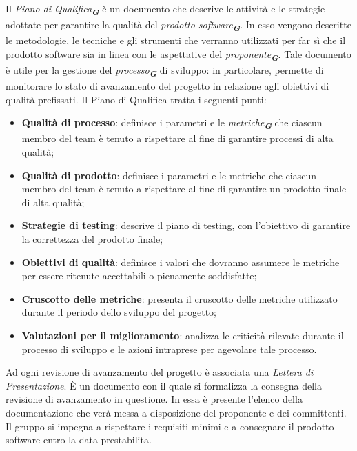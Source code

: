 Il \emph{Piano di Qualifica}\textsubscript{\textit{\textbf{G}}} è un documento che descrive le attività e le strategie adottate per
garantire la qualità del \emph{prodotto software}\textsubscript{\textit{\textbf{G}}}. In esso vengono descritte le metodologie, le
tecniche e gli strumenti che verranno utilizzati per far sì che il prodotto software sia in linea
con le aspettative del \emph{proponente}\textsubscript{\textit{\textbf{G}}}. Tale documento è utile per la gestione del \emph{processo}\textsubscript{\textit{\textbf{G}}}
di sviluppo: in particolare, permette di monitorare lo stato di avanzamento del progetto in relazione agli obiettivi di qualità prefissati.
Il Piano di Qualifica tratta i seguenti punti:

\begin{itemize}
    \item \textbf{Qualità di processo}: definisce i parametri e le \emph{metriche}\textsubscript{\textit{\textbf{G}}} che ciascun membro del
    team è tenuto a rispettare al fine di garantire processi di alta qualità;
    \item \textbf{Qualità di prodotto}: definisce i parametri e le metriche che ciascun membro del team
    è tenuto a rispettare al fine di garantire un prodotto finale di alta qualità;
    \item \textbf{Strategie di testing}: descrive il piano di testing, con l’obiettivo di garantire la correttezza del prodotto finale;    
    \item \textbf{Obiettivi di qualità}: definisce i valori  che dovranno assumere le metriche per essere ritenute accettabili o pienamente soddisfatte;
    \item \textbf{Cruscotto delle metriche}: presenta il cruscotto delle metriche utilizzato durante il periodo dello sviluppo del progetto;
    \item \textbf{Valutazioni per il miglioramento}: analizza le criticità rilevate durante il processo di sviluppo e le azioni intraprese per agevolare tale processo.
\end{itemize}

Ad ogni revisione di avanzamento del progetto è associata una \emph{Lettera di Presentazione}.
È un documento con il quale si formalizza la consegna della revisione di avanzamento in questione. 
In essa è presente l’elenco della documentazione che verà messa a disposizione del proponente e dei committenti. 
Il gruppo si impegna a rispettare i requisiti minimi e a consegnare il prodotto software entro la data prestabilita.

